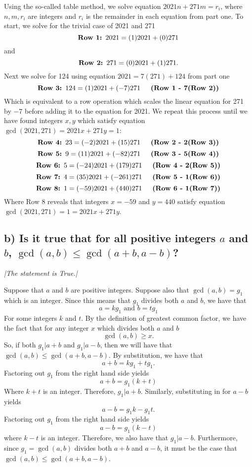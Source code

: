 \documentclass[11pt, letterpaper]{article}
\begin{document}
\begin{sol}
    Using the so-called table method, we solve equation $2021n+271m=r_{i}$, where $n,m,r_{i}$ are integers and $r_{i}$ is the remainder
    in each equation from part one. To start, we solve for the trivial case of 2021 and 271
    \[\text{\bf Row 1: }2021=(1)2021+(0)271\]
    and
    \[\text{\bf Row 2: }271=(0)2021+(1)271\text{.}\]
    Next we solve for 124 using equation $2021=7(271)+124$ from part one
    \[\text{\bf Row 3: }124 = (1)2021+(-7)271\text{\bf\indent (Row 1 - 7(Row 2))}\]
    Which is equivalent to a row operation which scales the linear equation for 271 by $-7$ before adding it to the equation for 2021.
    We repeat this process until we have found integers $x,y$ which satisfy equation $\gcd{(2021,271)}=2021x+271y=1$:
    \[\text{\bf Row 4: }23=(-2)2021+(15)271\text{\bf\indent (Row 2 - 2(Row 3))}\]
    \[\text{\bf Row 5: }9=(11)2021+(-82)271\text{\bf\indent (Row 3 - 5(Row 4))}\]
    \[\text{\bf Row 6: }5=(-24)2021+(179)271\text{\bf\indent (Row 4 - 2(Row 5))}\]
    \[\text{\bf Row 7: }4=(35)2021+(-261)271\text{\bf\indent (Row 5 - 1(Row 6))}\]
    \[\text{\bf Row 8: }1=(-59)2021+(440)271\text{\bf\indent (Row 6 - 1(Row 7))}\]
    Where Row 8 reveals that integers $x=-59$ and $y=440$ satisfy equation $\gcd{(2021,271)}=1=2021x+271y$.
\end{sol}

\subsection*{b) Is it true that for all positive integers $a$ and $b$, $\gcd{(a,b)}\leq \gcd{(a+b,a-b)}$?}
{\large\it |The statement is True.|}
\begin{prf}
    Suppose that $a$ and $b$ are positive integers. Suppose also that $\gcd{(a,b)}=g_{1}$ which is an integer. Since this means that $g_{1}$ divides both $a$ and $b$, we have that
    \[a=kg_{1}\text{ and }b=tg_{1}\] 
    For some integers $k$ and $t$. By the definition of greatest common factor, we have the fact that for any integer $x$ which divides both $a$ and $b$
    \[\gcd{(a,b)}\geq x\text{.}\]
    So, if both $g_{1}|a+b$ and $g_{1}|a-b$, then we will have that $\gcd{(a,b)}\leq \gcd{(a+b,a-b)}$. By substitution, we have that
    \[a+b=kg_{1}+tg_{1}\text{.}\]
    Factoring out $g_{1}$ from the right hand side yields
    \[a+b=g_{1}(k+t)\]
    Where $k+t$ is an integer. Therefore, $g_{1}|a+b$. Similarly, substituting in for $a-b$ yields
    \[a-b=g_{1}k-g_{1}t\text{.}\]
    Factoring out $g_{1}$ from the right hand side yields
    \[a-b=g_{1}(k-t)\] 
    where $k-t$ is an integer. Therefore, we also have that $g_{1}|a-b$. Furthermore, since $g_{1}=\gcd{(a,b)}$ divides both
    $a+b$ and $a-b$, it must be the case that $\gcd{(a,b)}\leq \gcd{(a+b,a-b)}$.
\end{prf}
\end{document}
